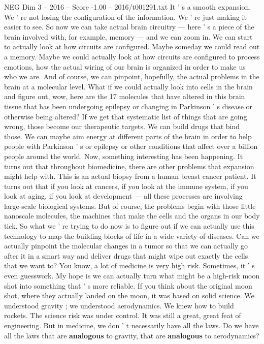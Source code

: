 \begin{textsample}{NEG Dim 3 – 2016 – Score -1.00 – 2016/t001291.txt}
It ' s a smooth expansion.
We ' re not losing the configuration of the information.
We ' re just making it easier to see.
So now we can take actual brain circuitry — here ' s a piece of the brain involved with, for example, memory — and we can zoom in.
We can start to actually look at how circuits are configured.
Maybe someday we could read out a memory.
Maybe we could actually look at how circuits are configured to process emotions, how the actual wiring of our brain is organized in order to make us who we are.
And of course, we can pinpoint, hopefully, the actual problems in the brain at a molecular level.
What if we could actually look into cells in the brain and figure out, wow, here are the 17 molecules that have altered in this brain tissue that has been undergoing epilepsy or changing in Parkinson ' s disease or otherwise being altered?
If we get that systematic list of things that are going wrong, those become our therapeutic targets.
We can build drugs that bind those.
We can maybe aim energy at different parts of the brain in order to help people with Parkinson ' s or epilepsy or other conditions that affect over a billion people around the world.
Now, something interesting has been happening.
It turns out that throughout biomedicine, there are other problems that expansion might help with.
This is an actual biopsy from a human breast cancer patient.
It turns out that if you look at cancers, if you look at the immune system, if you look at aging, if you look at development — all these processes are involving large-scale biological systems.
But of course, the problems begin with those little nanoscale molecules, the machines that make the cells and the organs in our body tick.
So what we ' re trying to do now is to figure out if we can actually use this technology to map the building blocks of life in a wide variety of diseases.
Can we actually pinpoint the molecular changes in a tumor so that we can actually go after it in a smart way and deliver drugs that might wipe out exactly the cells that we want to?
You know, a lot of medicine is very high risk.
Sometimes, it ' s even guesswork.
My hope is we can actually turn what might be a high-risk moon shot into something that ' s more reliable.
If you think about the original moon shot, where they actually landed on the moon, it was based on solid science.
We understood gravity ; we understood aerodynamics.
We knew how to build rockets.
The science risk was under control.
It was still a great, great feat of engineering.
But in medicine, we don ' t necessarily have all the laws.
Do we have all the laws that are \textbf{analogous} to gravity, that are \textbf{analogous} to aerodynamics?

\end{textsample}
